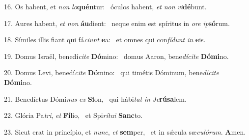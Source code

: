 16. Os habent, et \textit{non} \textit{lo}\textbf{quén}tur: \ast\  óculos habent, \textit{et} \textit{non} \textit{vi}\textbf{dé}bunt.\

17. Aures habent, \textit{et} \textit{non} \textbf{áu}dient: \ast\  neque enim est spíritus in \textit{o}\textit{re} \textit{ip}\textbf{só}rum.\

18. Símiles illis fiant qui fá\textit{ci}\textit{unt} \textbf{e}a: \ast\  et omnes qui con\textit{fí}\textit{dunt} \textit{in} \textbf{e}is.\

19. Domus Israël, benedí\textit{ci}\textit{te} \textbf{Dó}mino: \ast\  domus Aaron, bene\textit{dí}\textit{ci}\textit{te} \textbf{Dó}\textbf{mi}no.\

20. Domus Levi, benedí\textit{ci}\textit{te} \textbf{Dó}mino: \ast\  qui timétis Dóminum, bene\textit{dí}\textit{ci}\textit{te} \textbf{Dó}\textbf{mi}no.\

21. Benedíctus Dómi\textit{nus} \textit{ex} \textbf{Si}on, \ast\  qui hábi\textit{tat} \textit{in} \textit{Je}\textbf{rú}\textbf{sa}lem.\

22. Glória Pa\textit{tri}, \textit{et} \textbf{Fí}lio, \ast\  et Spi\textit{rí}\textit{tu}\textit{i} \textbf{Sanc}to.\

23. Sicut erat in princípio, et \textit{nunc}, \textit{et} \textbf{sem}per, \ast\  et in sǽcula sæ\textit{cu}\textit{ló}\textit{rum}. \textbf{A}men.\

